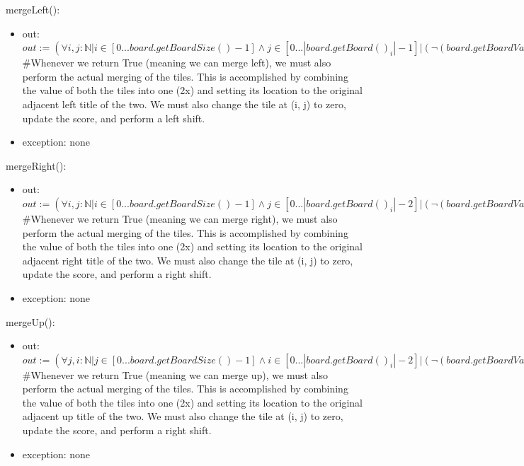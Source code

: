 \documentclass[12pt]{article}
\begin{document}
\noindent mergeLeft():
\begin{itemize}
\item out: $out := (\forall i,j : \mathbb{N} \vert i \in [0...board.getBoardSize() - 1] \land j \in [0...|board.getBoard()_i| - 1] \vert (\lnot (board.getBoardValueAt(i, j - 1) = 0) \land \lnot (board.getBoardValueAt(i, j) = 0) \Rightarrow (board.getBoardValueAt(i, j) = board.getBoardValueAt(i, j - 1)) \Rightarrow True) \vert (True \Rightarrow False)))$\\
\#Whenever we return True (meaning we can merge left), we must also perform the actual merging of the tiles. This is accomplished by combining the value of both the tiles into one (2x) and setting its location to the original adjacent left title of the two. We must also change the tile at (i, j) to zero, update the score, and perform a left shift.
\item exception: none
\end{itemize}

\noindent mergeRight():
\begin{itemize}
\item out: $out := (\forall i,j : \mathbb{N} \vert i \in [0...board.getBoardSize() - 1] \land j \in [0...|board.getBoard()_i| - 2] \vert (\lnot (board.getBoardValueAt(i, j) = 0) \land \lnot (board.getBoardValueAt(i, j + 1) = 0) \Rightarrow (board.getBoardValueAt(i, j) = board.getBoardValueAt(i, j + 1)) \Rightarrow True) \vert (True \Rightarrow False)))$\\
\#Whenever we return True (meaning we can merge right), we must also perform the actual merging of the tiles. This is accomplished by combining the value of both the tiles into one (2x) and setting its location to the original adjacent right title of the two. We must also change the tile at (i, j) to zero, update the score, and perform a right shift.
\item exception: none
\end{itemize}

\noindent mergeUp():
\begin{itemize}
\item out: $out := (\forall j,i : \mathbb{N} \vert j \in [0...board.getBoardSize() - 1] \land i \in [0...|board.getBoard()_i| - 2] \vert (\lnot (board.getBoardValueAt(i, j) = 0) \land \lnot (board.getBoardValueAt(i + 1, j) = 0) \Rightarrow (board.getBoardValueAt(i, j) = board.getBoardValueAt(i + 1, j)) \Rightarrow True) \vert (True \Rightarrow False)))$\\
\#Whenever we return True (meaning we can merge up), we must also perform the actual merging of the tiles. This is accomplished by combining the value of both the tiles into one (2x) and setting its location to the original adjacent up title of the two. We must also change the tile at (i, j) to zero, update the score, and perform a right shift.
\item exception: none
\end{itemize}
\end{document}

